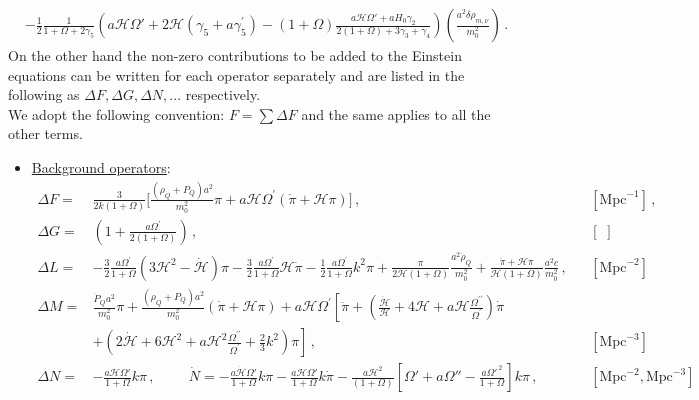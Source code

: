 \documentclass[prd,nofootinbib,showpacs]{revtex4}
\def\l{\left}
\def\r{\right}
\def\f{\frac}
\def\hub{{\mathcal H}}
\begin{document}
{\begin{align}
& -\f{1}{2}\f{1}{1+\Omega+2\gamma_5}\l( a\hub\Omega' +2\hub\l(\gamma_5+a\gamma_5^\prime\r) -(1+\Omega)\f{a\hub\Omega' +aH_0\gamma_2}{2(1+\Omega) +3\gamma_3+\gamma_4}\r)\l(\f{a^2\delta\rho_{m,\nu}}{m_0^2} \r) \, .\label{EEFT}
\end{align}
%
On the other hand the non-zero contributions to be added to the Einstein equations can be written for each operator separately and are listed in the following as $\Delta F,\Delta G, \Delta N,...$ respectively.\\
We adopt the following convention: $F=\sum \Delta F$ and the same applies to all the other terms.
%
\begin{itemize}
%
\item[] \underline{Background operators}:\\
{\small
\begin{align} \label{Eq:BackgroundOp}
\Delta F =& \frac{3}{2k(1+\Omega)}\bigg[\frac{(\rho_Q+P_Q)a^2}{m_0^2}\pi + a \mathcal{H} \Omega^\prime \left( \dot{\pi} + \mathcal{H} \pi \right) \bigg] \, , & & [\text{Mpc}^{-1}] \,, \nonumber \\
%
\Delta G =&  \left(1+ \frac{a\Omega^\prime}{2(1+\Omega)} \right)\,, \, & & [\,\,] \, \nonumber \\
%
\Delta L =& -\frac{3}{2}\frac{a\Omega^\prime}{1+\Omega}(3 \mathcal{H}^2 - \dot{\mathcal{H}})\pi -\frac{3}{2}\frac{a\Omega^\prime}{1+\Omega}\mathcal{H}\dot{\pi} -\frac{1}{2}\frac{a\Omega^\prime}{1+\Omega}k^2\pi + \frac{\pi}{2\mathcal{H}(1+\Omega)}\frac{a^2\dot{\rho}_Q}{m_0^2} + \frac{\dot{\pi}+ \mathcal{H}\pi}{\mathcal{H}(1+\Omega)}\frac{a^2c}{m_0^2}  \, , & & [\text{Mpc}^{-2}] \, \nonumber \\
%
\Delta M =& \frac{\dot{P}_Qa^2}{m_0^2}\pi + \frac{(\rho_Q + P_Q)a^2}{m_0^2}\left(\dot{\pi} + \mathcal{H} \pi \right) + a\mathcal{H}\Omega^\prime \left[ \ddot{\pi}+\left(\frac{\dot{\hub}}{\hub}+4\hub+a\hub\frac{\Omega^{\prime\prime}}{\Omega^{\prime}}\right)\dot{\pi} \right. \nonumber \\ 
&\left. + \left(2\dot{\hub}+6\hub^2+a\hub^2\frac{\Omega^{\prime\prime}}{\Omega^{\prime}}+\frac{2}{3}k^2\right) \pi\right] \, , & & [\text{Mpc}^{-3}] \, \nonumber \\
%
\Delta N =& -\f{a\hub\Omega'}{1+\Omega}k\pi \,, \hspace{1cm} \dot{N} =-\f{a\dot{\hub}\Omega'}{1+\Omega}k\pi  -\f{a\hub\Omega'}{1+\Omega}k\dot{\pi} -\f{a\hub^2}{(1+\Omega)}\l[\Omega' +a\Omega'' -\f{a\Omega'^{\,2}}{1+\Omega} \r]k\pi  \, , & & [\text{Mpc}^{-2}, \text{Mpc}^{-3}] \, \nonumber \\

\end{align}}
\end{itemize}}
\end{document}
